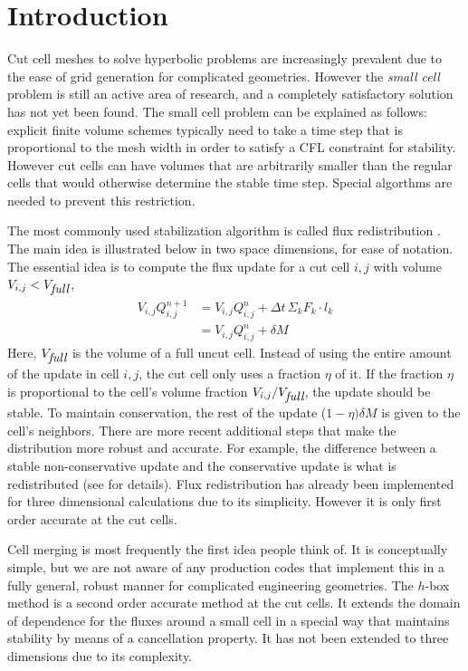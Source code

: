 \section{Introduction}\label{sec:intro}
Cut cell meshes to solve hyperbolic problems 
are increasingly prevalent due to the ease 
of grid generation for complicated geometries. 
However the {\em small cell} problem is still an active area of research, and
a completely satisfactory solution has not yet been found.
The small cell problem can be explained as follows: explicit
finite volume schemes typically need to take a time step 
that is proportional to the mesh width in order to satisfy a CFL constraint for
stability. However cut cells can have volumes that are arbitrarily
smaller than the regular cells that would otherwise determine the stable time
step. Special algorthms are needed to prevent this restriction.

The most commonly used stabilization algorithm is called flux
redistribution \cite{chern:colella,vof:colella}. The main idea is illustrated below in two space
dimensions, for ease of notation.
The essential idea is to compute the 
flux update for a cut cell $i,j$ with volume $V_{i,j} < V_{\mbox{\em full}}$,
\begin{eqnarray*}
V_{i,j} Q_{i,j} ^{n+1} & = V_{i,j} Q_{i,j}^n  +  \Delta t \, \Sigma_k F_k \cdot l_{k}\\
                   & = V_{i,j} Q_{i,j}^n  +  \delta  M 
\end{eqnarray*}
Here, $V_{\mbox{\em full}}$ is the volume of a full uncut cell.
Instead of using the entire amount of the update in cell ${i,j}$, 
the cut cell only uses a fraction $\eta$ of it.  If the fraction $\eta$
is proportional to the cell's volume
fraction $V_{i,j}/V_{\mbox{\em full}}$, the update should be stable. 
To maintain conservation, the rest of the update ($1-\eta)\delta M$
is given to the cell's neighbors.  
There are more recent additional steps that make the distribution 
more robust and accurate. For example, the difference between a stable
non-conservative update and the conservative update is what is
redistributed (see \cite{vof:colella} for details).
Flux redistribution has already been implemented for three dimensional
calculations due to its simplicity. However it is only first order
accurate at the cut cells.

Cell merging is most frequently the first idea people 
think of. It is conceptually simple, but 
we are not aware of any production codes that implement this in a fully
general, robust manner for complicated engineering geometries. 
The $h$-box method \cite{mjb-hel-rjl:hbox2,mjb-hel:hboxsimple}
is a second order accurate method at the cut cells. It extends the 
domain of dependence for the fluxes around a small cell in a 
special way that maintains stability by means of a cancellation
property. It  has not been extended to
three dimensions due to its complexity. 


